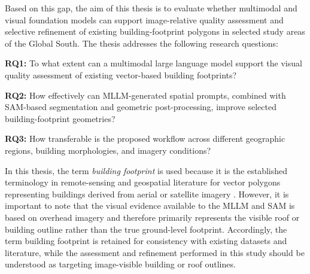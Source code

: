 Based on this gap, the aim of this thesis is to evaluate whether multimodal and visual foundation models can support image-relative quality assessment and selective refinement of existing building-footprint polygons in selected study areas of the Global South. The thesis addresses the following research questions:

\textbf{RQ1:} To what extent can a multimodal large language model support the visual quality assessment of existing vector-based building footprints?

\textbf{RQ2:} How effectively can MLLM-generated spatial prompts, combined with SAM-based segmentation and geometric post-processing, improve selected building-footprint geometries?

\textbf{RQ3:} How transferable is the proposed workflow across different geographic regions, building morphologies, and imagery conditions?

In this thesis, the term \textit{building footprint} is used because it is the established terminology in remote-sensing and geospatial literature for vector polygons representing buildings derived from aerial or satellite imagery \citep{sirko2021continentalscalebuildingdetectionhigh, rastogi2022automatic}. However, it is important to note that the visual evidence available to the MLLM and SAM is based on overhead imagery and therefore primarily represents the visible roof or building outline rather than the true ground-level footprint. Accordingly, the term building footprint is retained for consistency with existing datasets and literature, while the assessment and refinement performed in this study should be understood as targeting image-visible building or roof outlines.

